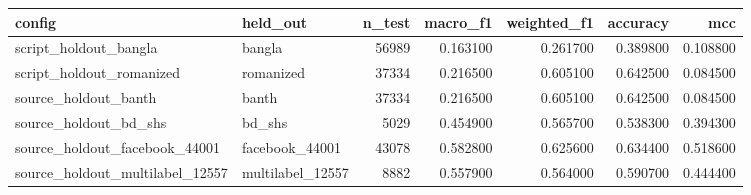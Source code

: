 \begin{tabular}{llrrrrr}
\toprule
config & held\_out & n\_test & macro\_f1 & weighted\_f1 & accuracy & mcc \\
\midrule
script\_holdout\_bangla & bangla & 56989 & 0.163100 & 0.261700 & 0.389800 & 0.108800 \\
script\_holdout\_romanized & romanized & 37334 & 0.216500 & 0.605100 & 0.642500 & 0.084500 \\
source\_holdout\_banth & banth & 37334 & 0.216500 & 0.605100 & 0.642500 & 0.084500 \\
source\_holdout\_bd\_shs & bd\_shs & 5029 & 0.454900 & 0.565700 & 0.538300 & 0.394300 \\
source\_holdout\_facebook\_44001 & facebook\_44001 & 43078 & 0.582800 & 0.625600 & 0.634400 & 0.518600 \\
source\_holdout\_multilabel\_12557 & multilabel\_12557 & 8882 & 0.557900 & 0.564000 & 0.590700 & 0.444400 \\
\bottomrule
\end{tabular}
